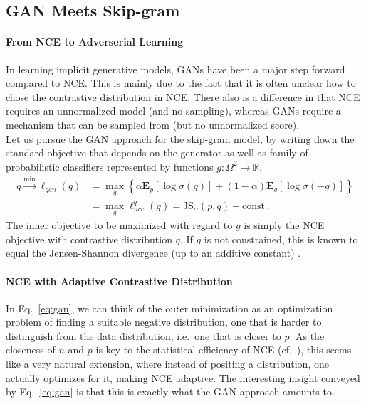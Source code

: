 \documentclass{article}
\renewcommand{\Re}{{\mathbb R}}
\newcommand{\E}{{\mathbf E}}
\newcommand{\textred}[1]{{\color{Red} #1}}
\begin{document}
\subsection*{\textred{GAN Meets Skip-gram}}

\paragraph{From NCE to Adverserial Learning} In learning implicit generative models, GANs \cite{goodfellow2014generative} have been a major step forward compared to NCE. This is mainly due to the fact that it is often unclear how to chose the contrastive distribution in NCE. There also is a difference in that NCE requires an unnormalized model (and no sampling), whereas GANs require a mechanism that can be sampled from (but no unnormalized score).\\

Let us pursue the  GAN approach for the skip-gram model, by writing down the standard objective that depends on the generator as well as family of probabilistic classifiers represented by functions $g : \Omega^2 \to \Re$,
\begin{align}
\label{eq:gan}
q \stackrel{\min}{\rightarrow} \ell_{gan} (q) & = \max_{g}
\left\{ \alpha \E_p\left[ \log \sigma(g) \right]  + (1-\alpha) \E_{q}\left[ \log \sigma(-g) \right] \right\} 
\\
& = \max_g \ell_{nce}^{q}(g) = \text{JS}_\alpha(p,q) + \text{const}\,.
\end{align}
The inner objective to be maximized with regard to $g$ is simply the NCE objective with contrastive distribution $q$. If $g$ is not constrained, this is known to equal the Jensen-Shannon divergence (up to an additive constant) \cite{goodfellow2014generative}.

\paragraph{NCE with Adaptive Contrastive Distribution}  In Eq.~\eqref{eq:gan}, we can think of the outer minimization as an optimization problem of finding a suitable negative distribution, one that is harder to distinguish from the data distribution, i.e.~one that is closer to $p$. As the closeness of $n$ and $p$ is key to the statistical efficiency of NCE (cf.~\cite[Theorem 3]{gutmann2012noise}), this seems like a very natural extension, where instead of positing a distribution, one actually optimizes for it, making NCE adaptive.  The interesting insight conveyed by Eq.~\eqref{eq:gan} is that this is exactly what the GAN approach amounts to.\\
\end{document}
